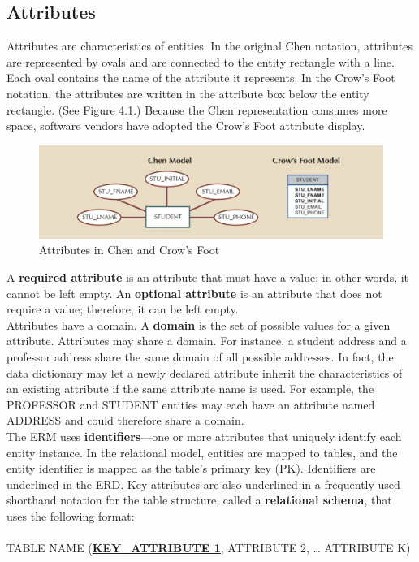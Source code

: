 \documentclass[a4paper, 12pt, titlepage]{report}
\begin{document}
{\subsection{Attributes}
Attributes are characteristics of entities. In the original Chen notation, attributes are represented by ovals and are connected to the entity rectangle with a line. Each oval contains the name of the attribute it represents. In the Crow’s Foot notation, the attributes are written in the attribute box below the entity rectangle. (See Figure 4.1.) Because the Chen representation consumes more space, software vendors have adopted the Crow’s Foot attribute display.
\begin{figure}[H]
\centering
\includegraphics[scale=0.5]{Attr}
\caption{Attributes in Chen and Crow's Foot}
\end{figure}
\noindent A \textbf{required attribute} is an attribute that must have a value; in other words, it cannot be left empty. An \textbf{optional attribute} is an attribute that does not require a value; therefore, it can be left empty.\\
Attributes have a domain. A \textbf{domain} is the set of possible values for a given attribute. Attributes may share a domain. For instance, a student address and a professor
address share the same domain of all possible addresses. In fact, the data dictionary may let a newly declared attribute inherit the characteristics of an existing attribute if the
same attribute name is used. For example, the PROFESSOR and STUDENT entities may each have an attribute named ADDRESS and could therefore share a domain.\\
The ERM uses \textbf{identifiers}—one or more attributes that uniquely identify each entity instance. In the relational model, entities are mapped to tables, and the entity identifier is mapped as the table’s primary key (PK). Identifiers are underlined in the ERD. Key attributes are also underlined in a frequently used shorthand notation for the table structure, called a \textbf{relational schema}, that uses the following format:\\ \\
TABLE NAME (\uline{\textbf{{KEY\_ATTRIBUTE 1}}}, ATTRIBUTE 2, … ATTRIBUTE K)\\ \\
}
\end{document}
